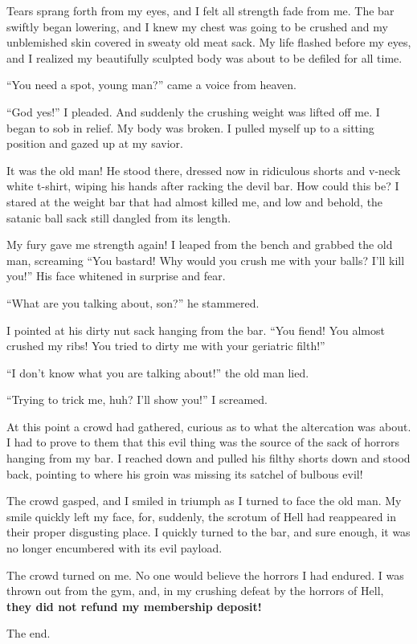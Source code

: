 Tears sprang forth from my eyes, and I felt all strength fade from
me. The bar swiftly began lowering, and I knew my chest was going
to be crushed and my unblemished skin covered in sweaty old meat
sack. My life flashed before my eyes, and I realized my beautifully
sculpted body was about to be defiled for all time.



``You need a spot, young man?'' came a voice from heaven.



``God yes!'' I pleaded. And suddenly the crushing weight was lifted
off me. I began to sob in relief. My body was broken. I pulled
myself up to a sitting position and gazed up at my savior.



It was the old man! He stood there, dressed now in ridiculous
shorts and v-neck white t-shirt, wiping his hands after racking the
devil bar. How could this be? I stared at the weight bar that had
almost killed me, and low and behold, the satanic ball sack still
dangled from its length.



My fury gave me strength again! I leaped from the bench and grabbed
the old man, screaming ``You bastard! Why would you crush me with
your balls? I'll kill you!'' His face whitened in surprise and
fear.



``What are you talking about, son?'' he stammered.



I pointed at his dirty nut sack hanging from the bar. ``You fiend! You
almost crushed my ribs! You tried to dirty me with your geriatric
filth!''



``I don't know what you are talking about!'' the old man lied.



``Trying to trick me, huh? I'll show you!'' I screamed.



At this point a crowd had gathered, curious as to what the
altercation was about. I had to prove to them that this evil thing
was the source of the sack of horrors hanging from my bar. I
reached down and pulled his filthy shorts down and stood back,
pointing to where his groin was missing its satchel of bulbous
evil!



The crowd gasped, and I smiled in triumph as I turned to face the
old man. My smile quickly left my face, for, suddenly, the scrotum
of Hell had reappeared in their proper disgusting place. I quickly
turned to the bar, and sure enough, it was no longer encumbered
with its evil payload.



The crowd turned on me. No one would believe the horrors I had
endured. I was thrown out from the gym, and, in my crushing defeat
by the horrors of Hell, {\bf they did not refund my membership
deposit!}



The end. 
 






